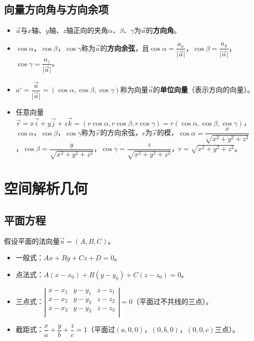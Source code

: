 \subsection{向量方向角与方向余项}

\begin{itemize}
    \item $\vec{a}$与$x$轴、$y$轴、$z$轴正向的夹角$\alpha$、$\beta$、$\gamma$为$\vec{a}$的\textbf{方向角}。
    \item $\cos\alpha$，$\cos\beta$，$\cos\gamma$称为$\vec{a}$的\textbf{方向余弦}，且$\cos\alpha=\dfrac{a_x}{\vert\vec{a}\vert}$，$\cos\beta=\dfrac{a_y}{\vert\vec{a}\vert}$，$\cos\gamma=\dfrac{a_z}{\vert\vec{a}\vert}$。
    \item $a^\circ=\dfrac{\vec{a}}{\vert\vec{a}\vert}=(\cos\alpha,\cos\beta,\cos\gamma)$称为向量$\vec{a}$的\textbf{单位向量}（表示方向的向量）。
    \item 任意向量$\vec{r}=x\vec{i}+y\vec{j}+z\vec{k}=(r\cos\alpha,r\cos\beta,r\cos\gamma)=r(\cos\alpha,\cos\beta,\cos\gamma)$，$\cos\alpha$，$\cos\beta$，$\cos\gamma$称为$\vec{r}$的方向余弦，$r$为$\vec{r}$的模，$\cos\alpha=\dfrac{x}{\sqrt{x^2+y^2+z^2}}$，$\cos\beta=\dfrac{y}{\sqrt{x^2+y^2+z^2}}$，$\cos\gamma=\dfrac{z}{\sqrt{x^2+y^2+z^2}}$，$r=\sqrt{x^2+y^2+z^2}$。
\end{itemize}

\section{空间解析几何}

\subsection{平面方程}

假设平面的法向量$\vec{n}=(A,B,C)$。

\begin{itemize}
    \item 一般式：$Ax+By+Cz+D=0$。
    \item 点法式：$A(x-x_0)+B(y-y_0)+C(z-z_0)=0$。
    \item 三点式：$\left\vert\begin{array}{ccc}
        x-x_1 & y-y_1 & z-z_1 \\
        x-x_2 & y-y_2 & z-z_2 \\
        x-x_3 & y-y_3 & z-z_3 \\
    \end{array}\right\vert=0$（平面过不共线的三点）。
    \item 截距式：$\dfrac{x}{a}+\dfrac{y}{b}+\dfrac{z}{c}=1$（平面过$(a,0,0)$，$(0,b,0)$，$(0,0,c)$三点）。
\end{itemize}

